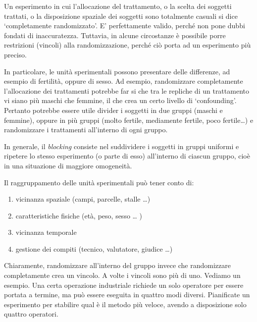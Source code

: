 \documentclass[a4paper,12pt,oneside]{book}
\providecommand{\tightlist}{%
  \setlength{\itemsep}{0pt}\setlength{\parskip}{0pt}}
\theoremstyle{definition}
\theoremstyle{definition}
\theoremstyle{definition}
\theoremstyle{remark}
\begin{document}
Un esperimento in cui l'allocazione del trattamento, o la scelta dei
soggetti trattati, o la disposizione spaziale dei soggetti sono
totalmente casuali si dice `completamente randomizzato'. E'
perfettamente valido, perché non pone dubbi fondati di inaccuratezza.
Tuttavia, in alcune circostanze è possibile porre restrizioni (vincoli)
alla randomizzazione, perché ciò porta ad un esperimento più preciso.

In particolare, le unità sperimentali possono presentare delle
differenze, ad esempio di fertilità, oppure di sesso. Ad esempio,
randomizzare completamente l'allocazione dei trattamenti potrebbe far si
che tra le repliche di un trattamento vi siano più maschi che femmine,
il che crea un certo livello di `confounding'. Pertanto potrebbe essere
utile divider i soggetti in due gruppi (maschi e femmine), oppure in più
gruppi (molto fertile, mediamente fertile, poco fertile\ldots{}) e
randomizzare i trattamenti all'interno di ogni gruppo.

In generale, il \emph{blocking} consiste nel suddividere i soggetti in
gruppi uniformi e ripetere lo stesso esperimento (o parte di esso)
all'interno di ciascun gruppo, cioè in una situazione di maggiore
omogeneità.

Il raggruppamento delle unità sperimentali può tener conto di:

\begin{enumerate}
\def\labelenumi{\arabic{enumi}.}
\tightlist
\item
  vicinanza spaziale (campi, parcelle, stalle \ldots{})
\item
  caratteristiche fisiche (età, peso, sesso \ldots{} )
\item
  vicinanza temporale
\item
  gestione dei compiti (tecnico, valutatore, giudice \ldots{})
\end{enumerate}

Chiaramente, randomizzare all'interno del gruppo invece che randomizzare
completamente crea un vincolo. A volte i vincoli sono più di uno.
Vediamo un esempio. Una certa operazione industriale richiede un solo
operatore per essere portata a termine, ma può essere eseguita in
quattro modi diversi. Pianificate un esperimento per stabilire qual è il
metodo più veloce, avendo a disposizione solo quattro operatori.
\end{document}
